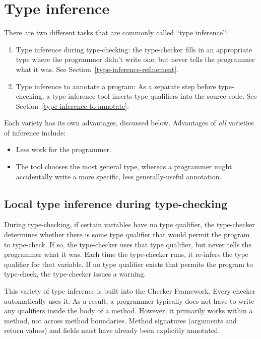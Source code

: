 \htmlhr
\chapter{Type inference\label{type-inference}}

There are two different tasks that are commonly called ``type inference'':
\begin{enumerate}
\item
  Type inference during type-checking:
  the type-checker fills in an appropriate type where the programmer didn't
  write one, but never tells the programmer what it was.
  See Section~\ref{type-inference-refinement}.
\item
  Type inference to annotate a program:
  As a separate step before type-checking, a type inference tool
  inserts type qualifiers into the source code.
  See Section~\ref{type-inference-to-annotate}.
\end{enumerate}

Each variety has its own advantages, discussed below.
Advantages of \emph{all} varieties of inference include:
\begin{itemize}
\item
  Less work for the programmer.
\item
  The tool chooses the most general type, whereas a programmer might
  accidentally write a more specific, less generally-useful annotation.
\end{itemize}


\section{Local type inference during type-checking\label{type-inference-refinement}}

During type-checking, if certain variables have no type qualifier, the
type-checker determines whether there is some type qualifier that would
permit the program to type-check.  If so, the type-checker uses that type
qualifier, but never tells the programmer what it was.  Each time the
type-checker runs, it re-infers the type qualifier for that variable.  If
no type qualifier exists that permits the program to type-check, the
type-checker issues a warning.

This variety of type inference is built into the Checker Framework.
Every checker automatically uses it.  As a result, a programmer typically
does not have to write any qualifiers inside the body of a method.
However, it primarily
works within a method, not across method boundaries.  Method
signatures (arguments and return values) and fields must have already been
explicitly annotated.

